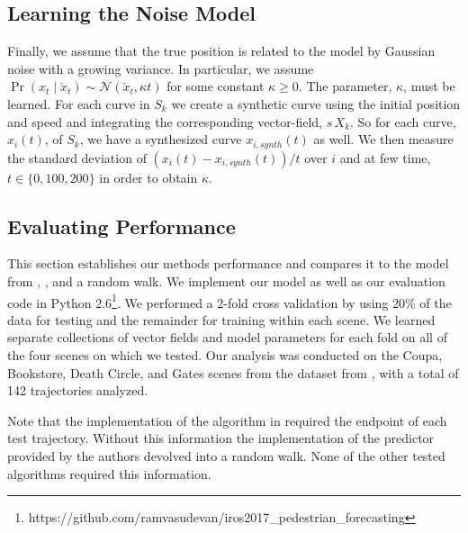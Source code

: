 \documentclass[letterpaper,10pt,conference]{ieeeconf}
\begin{document}
  \subsection{Learning the Noise Model}
  Finally, we assume that the true position is related to the model by Gaussian noise with a growing variance.
  In particular, we assume $\Pr( x_t \mid \check{x}_t) \sim \mathcal{N}( \check{x}_t , \kappa t)$ for some constant $\kappa \geq 0$.
  The parameter, $\kappa$, must be learned.
  For each curve in $S_k$ we create a synthetic curve using the initial position and speed and integrating the corresponding vector-field, $s\, X_k$.
  So for each curve, $x_i(t)$, of $S_k$, we have a synthesized curve $x_{i,synth}(t)$ as well.
  We then measure the standard deviation of $(x_i(t) - x_{i,synth}(t)) / t$ over $i$ and at few time, $t \in \{ 0, 100, 200 \}$ in order to obtain $\kappa$.
  
 \subsection{Evaluating Performance}
 
This section establishes our methods performance and compares it to the model from \cite{Kitani2012}, \cite{Alahi2016}, and a random walk.
We implement our model as well as our evaluation code in Python 2.6\footnote{https://github.com/ramvasudevan/iros2017\_pedestrian\_forecasting}.
We performed a 2-fold cross validation by using 20\% of the data for testing and the remainder for training within each scene. 
	We learned separate collections of vector fields and model parameters for each fold on all of the four scenes on which we tested.
Our analysis was conducted on the Coupa, Bookstore, Death Circle, and Gates scenes from the dataset from \cite{Robicquet2016}, with a total of 142 trajectories analyzed.



Note that the implementation of the algorithm in \cite{Kitani2012} required the endpoint of each test trajectory. 
Without this information the implementation of the predictor provided by the authors devolved into a random walk.
None of the other tested algorithms required this information.
\end{document}
